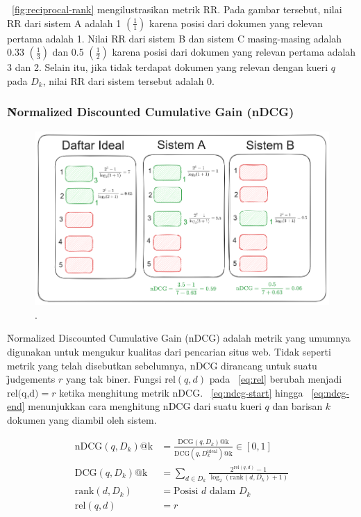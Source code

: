         \pic~\ref{fig:reciprocal-rank} mengilustrasikan metrik RR. Pada gambar tersebut, nilai RR dari sistem A adalah 1 $(\frac{1}{1})$ karena posisi dari dokumen yang relevan pertama adalah 1. Nilai RR dari sistem B dan sistem C masing-masing adalah  0.33 $(\frac{1}{3})$ dan 0.5 $(\frac{1}{2})$ karena posisi dari dokumen yang relevan pertama adalah 3 dan 2. Selain itu, jika tidak terdapat dokumen yang relevan dengan kueri $q$ pada $D_k$, nilai RR dari sistem tersebut adalah 0. 

    \subsubsection{\f{Normalized Discounted Cumulative Gain} (nDCG)}

        \begin{figure}
            \centering
            \includegraphics[width=1\textwidth]{assets/pics/contohnDCG.png}
            \caption{\license.}
            \label{fig:ndcg}
        \end{figure}

        \f{Normalized Discounted Cumulative Gain} (nDCG) adalah metrik yang umumnya digunakan untuk mengukur kualitas dari pencarian situs web. Tidak seperti metrik yang telah disebutkan sebelumnya, nDCG dirancang untuk suatu \f{judgements} $r$ yang tak biner. Fungsi $\text{rel}(q, d)$ pada \equ~\ref{eq:rel} berubah menjadi $\text{rel(q,d)}  = r $ ketika menghitung metrik nDCG. \equ~\ref{eq:ndcg-start} hingga \equ~\ref{eq:ndcg-end} menunjukkan cara menghitung nDCG dari suatu kueri $q$ dan barisan $k$ dokumen yang diambil oleh sistem.

        \begin{align}
            \label{eq:ndcg-start}
            \text{nDCG}(q, D_k)\text{@k} &= \frac{\text{DCG}(q, D_k)\text{@k}}{\text{DCG}(q, D_k^{\text{ideal}})\text{@k}} \in [0, 1] \\
            \label{eq:dcg}
            \text{DCG}(q, D_k)\text{@k} &= \sum_{d \in D_k} \frac{2^{\text{rel}(q, d)} - 1}{\log_2(\text{rank}(d, D_k) + 1)} \\
            \label{eq:ndcg-end}
            \text{rank}(d,D_k) &= \text{Posisi } d \text{ dalam } D_k \\
            \text{rel}(q, d) &= r
        \end{align}

